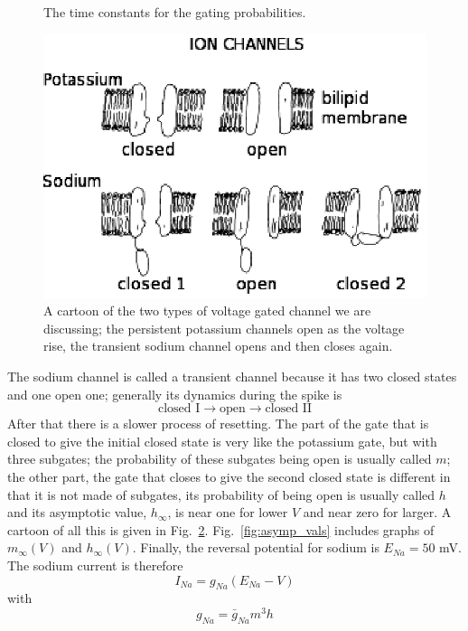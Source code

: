 \documentclass[11pt,a4paper]{scrartcl}
\begin{document}
\begin{figure}
\begin{center}

\end{center}
\caption{The time constants for the gating probabilities.\label{fig:tau_vals}}
\end{figure}


\begin{figure}
\begin{center}
\includegraphics{ChannelsBlack.eps}
\end{center}
\caption{A cartoon of the two types of voltage gated channel we are
  discussing; the persistent potassium channels open as the voltage
  rise, the transient sodium channel opens and then closes
  again.\label{ChannelsBlack}}
\end{figure}



The sodium channel is called a transient channel because it has two
closed states and one open one; generally its dynamics during the
spike is
\begin{equation}
\mbox{closed I}\rightarrow \mbox{open}\rightarrow\mbox{closed II}
\end{equation}
After that there is a slower process of resetting. The part of the
gate that is closed to give the initial closed state is very like the
potassium gate, but with three subgates; the probability of these
subgates being open is usually called $m$; the other part, the gate
that closes to give the second closed state is different in that it is
not made of subgates, its probability of being open is usually called
$h$ and its asymptotic value, $h_\infty$, is near one for lower $V$
and near zero for larger. A cartoon of all this is given in Fig.~\ref{ChannelsBlack}. Fig.~\ref{fig:asymp_vals} includes graphs of $m_\infty(V)$
and $h_\infty(V)$. Finally, the reversal potential for sodium is
$E_{Na}=50$ mV. The sodium current is therefore
\begin{equation}
I_{Na}=g_{Na}(E_{Na}-V)
\end{equation}
with
\begin{equation}
g_{Na}=\bar{g}_{Na}m^3h
\end{equation}
\end{document}
